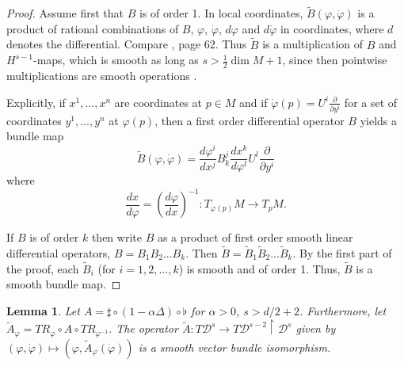 \documentclass[a5paper,10pt,twoside]{article}
\newcommand{\cD}{\ensuremath{\mathcal{D}}}
\theoremstyle{plain}
\newtheorem{lem}[teo]{Lemma}
\theoremstyle{definition}
\theoremstyle{remark}
\begin{document}
\begin{proof}
Assume first that $B$ is of order 1. In local coordinates, $\tilde{B}(\varphi,\dot{\varphi})$ is a product of rational combinations of $B$, $\varphi$, $\dot{\varphi}$, $d\varphi$ and $d\dot{\varphi}$ in coordinates, where $d$ denotes the differential. Compare \cite{lee2013introduction}, page 62. Thus $\tilde{B}$ is  a multiplication of $B$ and $H^{s-1}$-maps, which is smooth as long as $s>\frac{1}{2}\dim M+1$, since then pointwise multiplications are smooth operations \cite[section 2 and appendix A]{ebin1970groups}.

Explicitly, if $x^1,...,x^n$ are coordinates at $p\in M$ and if $\dot{\varphi}(p)=U^i\frac{\partial}{\partial y^i}$ for a set of coordinates $y^1,...,y^n$ at $\varphi(p)$, then a first order differential operator $B$ yields a bundle map
$$
\tilde{B}(\varphi,\dot{\varphi})=\frac{d\varphi^i}{dx^j}B^j_k\frac{dx^k}{d\varphi^l}U^l\frac{\partial}{\partial y^i}
$$
where
$$
\frac{dx}{d\varphi}=\left(\frac{d\varphi}{dx}\right)^{-1}:T_{\varphi(p)}M\to T_pM.
$$

If $B$ is  of order $k$ then write $B$ as a product of first order smooth linear differential operators, $B=B_1B_2...B_k$. Then $\tilde{B}=\tilde{B}_1\tilde{B}_2...\tilde{B}_k.$ By the first part of the proof, each $\tilde{B}_i$ (for $i=1,2,...,k$) is smooth and of order 1. Thus, $\tilde{B}$ is a smooth bundle map.
\end{proof}

\begin{lem}
	Let $A=\sharp\circ(1-\alpha\Delta)\circ \flat$ for $\alpha>0$, $s>d/2+2$. Furthermore, let $\tilde{A}_\varphi=TR_{\varphi}\circ A\circ TR_{\varphi^{-1}}.$ The operator $\tilde{A}:T\cD^s\to T\cD^{s-2}\upharpoonright \cD^{s}$ given by $(\varphi,\dot{\varphi})\mapsto(\varphi,\tilde{A}_{\varphi}(\dot{\varphi}))$ is a smooth vector bundle isomorphism.	
\end{lem}
\end{document}
